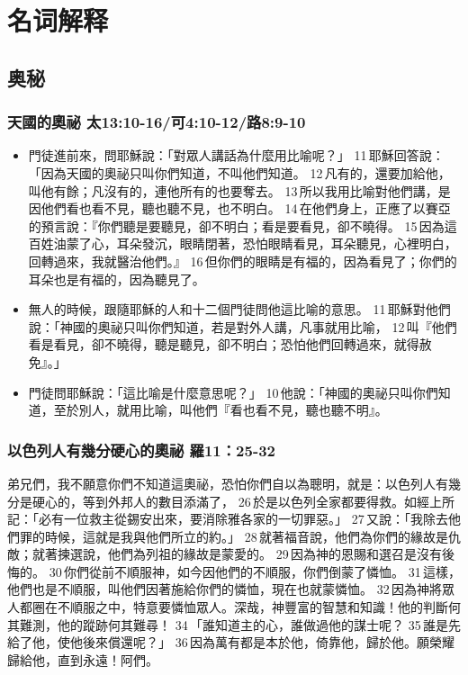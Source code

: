 

\section{名词解释}
\subsection{奥秘}

\subsubsection{天國的奧祕 太13:10-16/可4:10-12/路8:9-10}
\begin{itemize}
\item 門徒進前來，問耶穌說：「對眾人講話為什麼用比喻呢？」 11 耶穌回答說：「因為天國的奧祕只叫你們知道，不叫他們知道。 12 凡有的，還要加給他，叫他有餘；凡沒有的，連他所有的也要奪去。 13 所以我用比喻對他們講，是因他們看也看不見，聽也聽不見，也不明白。 14 在他們身上，正應了以賽亞的預言說：『你們聽是要聽見，卻不明白；看是要看見，卻不曉得。 15 因為這百姓油蒙了心，耳朵發沉，眼睛閉著，恐怕眼睛看見，耳朵聽見，心裡明白，回轉過來，我就醫治他們。』 16 但你們的眼睛是有福的，因為看見了；你們的耳朵也是有福的，因為聽見了。
\item 無人的時候，跟隨耶穌的人和十二個門徒問他這比喻的意思。 11 耶穌對他們說：「神國的奧祕只叫你們知道，若是對外人講，凡事就用比喻， 12 叫『他們看是看見，卻不曉得，聽是聽見，卻不明白；恐怕他們回轉過來，就得赦免』。」
\item 門徒問耶穌說：「這比喻是什麼意思呢？」 10 他說：「神國的奧祕只叫你們知道，至於別人，就用比喻，叫他們『看也看不見，聽也聽不明』。
\end{itemize}

\subsubsection{以色列人有幾分硬心的奧祕 羅11：25-32}
弟兄們，我不願意你們不知道這奧祕，恐怕你們自以為聰明，就是：以色列人有幾分是硬心的，等到外邦人的數目添滿了， 26 於是以色列全家都要得救。如經上所記：「必有一位救主從錫安出來，要消除雅各家的一切罪惡。」 27 又說：「我除去他們罪的時候，這就是我與他們所立的約。」 28 就著福音說，他們為你們的緣故是仇敵；就著揀選說，他們為列祖的緣故是蒙愛的。 29 因為神的恩賜和選召是沒有後悔的。 30 你們從前不順服神，如今因他們的不順服，你們倒蒙了憐恤。 31 這樣，他們也是不順服，叫他們因著施給你們的憐恤，現在也就蒙憐恤。 32 因為神將眾人都圈在不順服之中，特意要憐恤眾人。深哉，神豐富的智慧和知識！他的判斷何其難測，他的蹤跡何其難尋！ 34 「誰知道主的心，誰做過他的謀士呢？ 35 誰是先給了他，使他後來償還呢？」 36 因為萬有都是本於他，倚靠他，歸於他。願榮耀歸給他，直到永遠！阿們。
